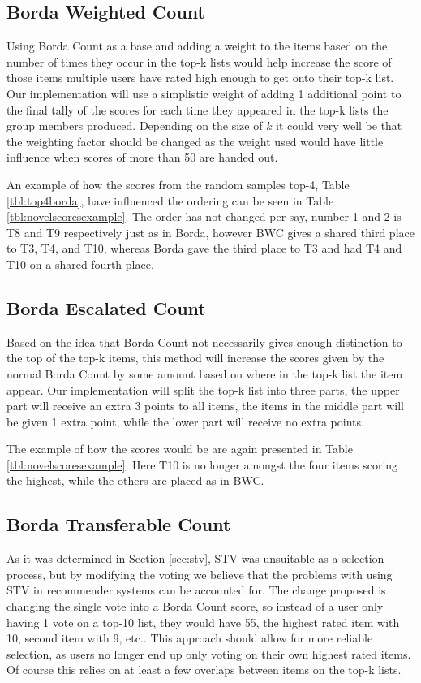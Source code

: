 \subsection{Borda Weighted Count}
Using Borda Count as a base and adding a weight to the items based on the number of times they occur in the top-k lists would help increase the score of those items multiple users have rated high enough to get onto their top-k list. Our implementation will use a simplistic weight of adding 1 additional point to the final tally of the scores for each time they appeared in the top-k lists the group members produced. Depending on the size of $k$ it could very well be that the weighting factor should be changed as the weight used would have little influence when scores of more than 50 are handed out.

An example of how the scores from the random samples top-4, Table \ref{tbl:top4borda}, have influenced the ordering can be seen in Table \ref{tbl:novelscoresexample}. The order has not changed per say, number 1 and 2 is T8 and T9 respectively just as in Borda, however BWC gives a shared third place to T3, T4, and T10, whereas Borda gave the third place to T3 and had T4 and T10 on a shared fourth place. 

\subsection{Borda Escalated Count}
Based on the idea that Borda Count not necessarily gives enough distinction to the top of the top-k items, this method will increase the scores given by the normal Borda Count by some amount based on where in the top-k list the item appear. Our implementation will split the top-k list into three parts, the upper part will receive an extra 3 points to all items, the items in the middle part will be given 1 extra point, while the lower part will receive no extra points.

The example of how the scores would be are again presented in Table \ref{tbl:novelscoresexample}. Here T10 is no longer amongst the four items scoring the highest, while the others are placed as in BWC.

\subsection{Borda Transferable Count} \label{BTC}
As it was determined in Section \ref{sec:stv}, STV was unsuitable as a selection process, but by modifying the voting we believe that the problems with using STV in recommender systems can be accounted for. The change proposed is changing the single vote into a Borda Count score, so instead of a user only having 1 vote on a top-10 list, they would have 55, the highest rated item with 10, second item with 9, etc.. This approach should allow for more reliable selection, as users no longer end up only voting on their own highest rated items. Of course this relies on at least a few overlaps between items on the top-k lists.\\

